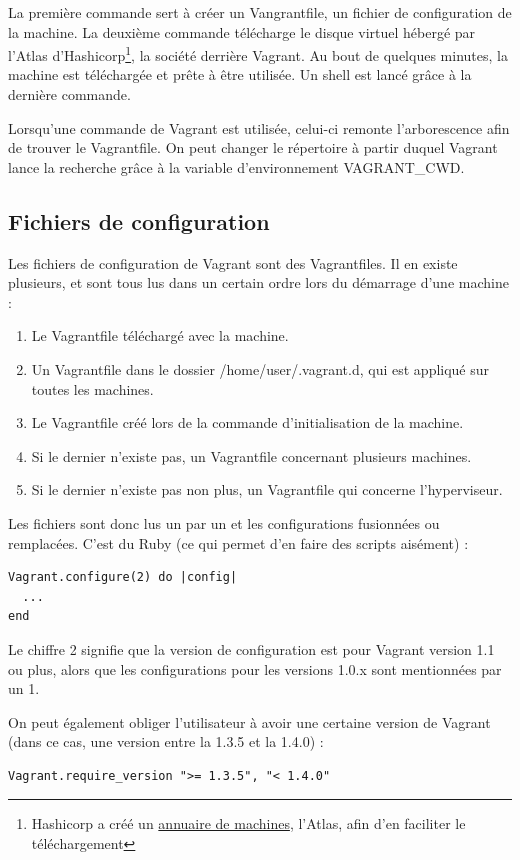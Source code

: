 \documentclass[12pt,a4paper]{article}
\begin{document}
La première commande sert à créer un Vangrantfile, un fichier de configuration de la machine. La deuxième commande télécharge le disque virtuel hébergé par l'Atlas d'Hashicorp\footnote{Hashicorp a créé un \href{https://atlas.hashicorp.com/boxes/search}{annuaire de machines}, l'Atlas, afin d'en faciliter le téléchargement}, la société derrière Vagrant.
Au bout de quelques minutes, la machine est téléchargée et prête à être utilisée. Un shell est lancé grâce à la dernière commande. 

Lorsqu'une commande de Vagrant est utilisée, celui-ci remonte l'arborescence afin de trouver le Vagrantfile. On peut changer le répertoire à partir duquel Vagrant lance la recherche grâce à la variable d'environnement VAGRANT\_CWD. 

\subsection{Fichiers de configuration}
Les fichiers de configuration de Vagrant sont des Vagrantfiles. Il en existe plusieurs, et sont tous lus dans un certain ordre lors du démarrage d'une machine :
\begin{enumerate}
	\item{Le Vagrantfile téléchargé avec la machine.}
	\item{Un Vagrantfile dans le dossier /home/user/.vagrant.d, qui est appliqué sur toutes les machines.}
	\item{Le Vagrantfile créé lors de la commande d'initialisation de la machine.}
	\item{Si le dernier n'existe pas, un Vagrantfile concernant plusieurs machines.}
	\item{Si le dernier n'existe pas non plus, un Vagrantfile qui concerne l'hyperviseur.}
\end{enumerate}

Les fichiers sont donc lus un par un et les configurations fusionnées ou remplacées. C'est du Ruby (ce qui permet d'en faire des scripts aisément) :
\begin{lstlisting}
Vagrant.configure(2) do |config|
  ...
end
\end{lstlisting}
Le chiffre 2 signifie que la version de configuration est pour Vagrant version 1.1 ou plus, alors que les configurations pour les versions 1.0.x sont mentionnées par un 1.

On peut également obliger l'utilisateur à avoir une certaine version de Vagrant (dans ce cas, une version entre la 1.3.5 et la 1.4.0) :
\begin{lstlisting}
Vagrant.require_version ">= 1.3.5", "< 1.4.0"
\end{lstlisting}
\end{document}
